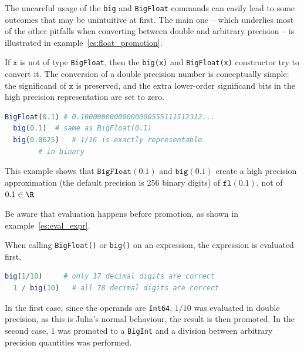 
\noindent The uncareful usage of the \texttt{big} and \texttt{BigFloat} commands can easily lead to some outcomes that may be unintuitive at first. The main one -- which underlies most of the other pitfalls when converting between double and arbitrary precision -- is illustrated in example~\ref{es:float_promotion}. 
\begin{esempio}\label{es:float_promotion}
	If $\mathtt{x}$ is not of type \texttt{BigFloat}, then the \texttt{big(x)} and \texttt{BigFloat(x)} constructor try to convert it. 
	The conversion of a double precision number is conceptually simple: the significand of $\mathtt{x}$ is preserved, and the extra lower-order significand bits in the high precision representation are set to zero.  
\begin{lstlisting}[language=Julia]
  BigFloat(0.1) # 0.10000000000000000555111512312...
  big(0.1)	# same as BigFloat(0.1)
  big(0.0625)	# 1/16 is exactly representable 
  		# in binary
\end{lstlisting}
	This example shows that $\texttt{BigFloat}(0.1)$ and $\texttt{big}(0.1)$ create a high precision approximation (the default precision is 256 binary digits) of $\mathtt{fl}(0.1)$, not of $0.1\in\R$
\end{esempio}
\smallskip

\noindent Be aware that evaluation happens before promotion, as shown in example~\ref{es:eval_expr}.
\begin{esempio}\label{es:eval_expr}
	When calling \texttt{BigFloat()} or \texttt{big()} on an expression, the expression is evaluated first. 
\begin{lstlisting}[language=Julia]
  big(1/10) 	# only 17 decimal digits are correct 
  1 / big(10)	# all 78 decimal digits are correct
\end{lstlisting}
	In the first case, since the operands are \texttt{Int64}, $1/10$ was evaluated in double precision, as this is Julia's normal behaviour, the result is then promoted. In the second case, $1$ was promoted to a \texttt{BigInt} and a division between arbitrary precision quantities was performed.
\end{esempio}

